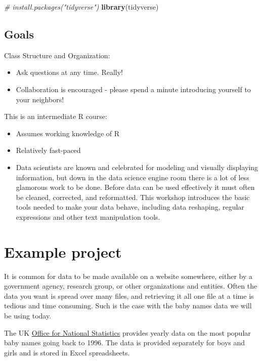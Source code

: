 \documentclass[]{book}
\newenvironment{Shaded}{\begin{snugshade}}{\end{snugshade}}
\newcommand{\KeywordTok}[1]{\textcolor[rgb]{0.13,0.29,0.53}{\textbf{#1}}}
\newcommand{\CommentTok}[1]{\textcolor[rgb]{0.56,0.35,0.01}{\textit{#1}}}
\newcommand{\NormalTok}[1]{#1}
\providecommand{\tightlist}{%
  \setlength{\itemsep}{0pt}\setlength{\parskip}{0pt}}
\begin{document}
\begin{Shaded}
\begin{Highlighting}[]
\CommentTok{# install.packages("tidyverse")}
\KeywordTok{library}\NormalTok{(tidyverse)}
\end{Highlighting}
\end{Shaded}

\subsection{Goals}\label{goals-3}

Class Structure and Organization:

\begin{itemize}
\tightlist
\item
  Ask questions at any time. Really!
\item
  Collaboration is encouraged - please spend a minute introducing
  yourself to your neighbors!
\end{itemize}

This is an intermediate R course:

\begin{itemize}
\tightlist
\item
  Assumes working knowledge of R
\item
  Relatively fast-paced
\item
  Data scientists are known and celebrated for modeling and visually
  displaying information, but down in the data science engine room there
  is a lot of less glamorous work to be done. Before data can be used
  effectively it must often be cleaned, corrected, and reformatted. This
  workshop introduces the basic tools needed to make your data behave,
  including data reshaping, regular expressions and other text
  manipulation tools.
\end{itemize}

\section{Example project}\label{example-project}

It is common for data to be made available on a website somewhere,
either by a government agency, research group, or other organizations
and entities. Often the data you want is spread over many files, and
retrieving it all one file at a time is tedious and time consuming. Such
is the case with the baby names data we will be using today.

The UK \href{https://www.ons.gov.uk}{Office for National Statistics}
provides yearly data on the most popular baby names going back to 1996.
The data is provided separately for boys and girls and is stored in
Excel spreadsheets.
\end{document}
